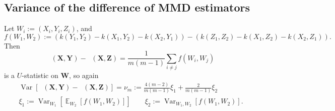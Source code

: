 \documentclass{article}
\DeclareMathOperator{\E}{\mathbb{E}}
\DeclareMathOperator{\Var}{Var}
\DeclareMathOperator{\mmdsqu}{\widehat{MMD}_U^2}
\newcommand{\setX}{\mathbf{X}}
\newcommand{\setY}{\mathbf{Y}}
\newcommand{\setZ}{\mathbf{Z}}
\newcommand{\setW}{\mathbf{W}}
\begin{document}
\subsection{Variance of the difference of MMD estimators} \label{sec:diff-expression}

Let $W_i := (X_i, Y_i, Z_i)$, and
\[
f(W_1, W_2) := 
\left( k(Y_1, Y_2) - k(X_1, Y_2) - k(X_2, Y_1) \right)
- \left( k(Z_1, Z_2) - k(X_1, Z_2) - k(X_2, Z_1) \right)
.\]
Then
\[
  \mmdsqu(\setX, \setY) - \mmdsqu(\setX, \setZ)
  = \frac{1}{m (m-1)} \sum_{i \ne j} f(W_i, W_j)
\]
is a $U$-statistic on $\setW$, so again
\begin{gather*}
  \Var[\mmdsqu(\setX, \setY) - \mmdsqu(\setX, \setZ)]
  = \nu_m
  := \frac{4 (m-2)}{m (m-1)} \xi_1 + \frac{2}{m (m-1)} \xi_2
\\
  \xi_1 := \Var_{W_1}\left[ \E_{W_2}\left[ f(W_1, W_2) \right] \right]
  \qquad
  \xi_2 := \Var_{W_1, W_2}\left[ f(W_1, W_2) \right]
.\end{gather*}
\end{document}
